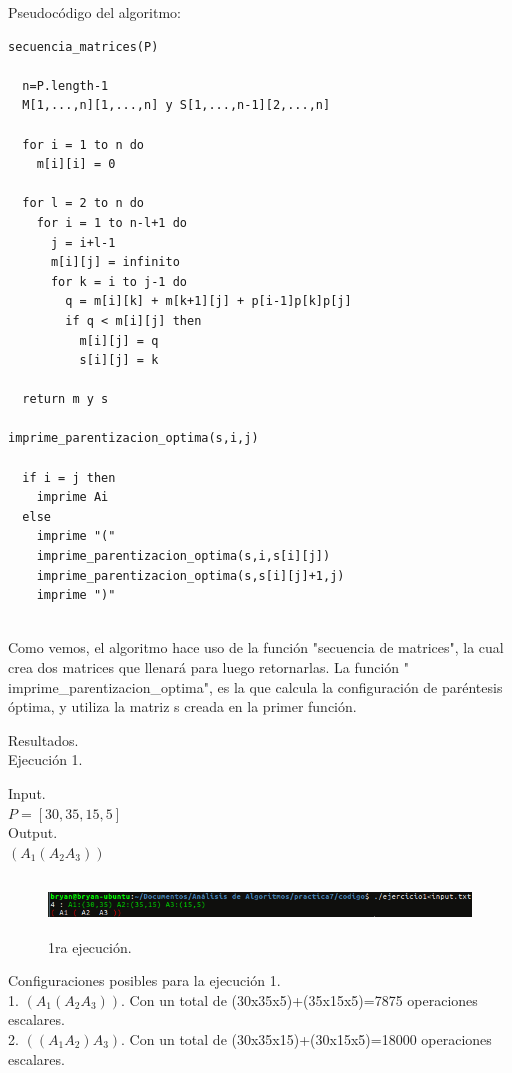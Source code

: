 \documentclass[12pt]{report}
\begin{document}
	
	Pseudocódigo del algoritmo:
	\lstset{language=C, breaklines=true, basicstyle=\footnotesize}
	\lstset{numbers=left, numberstyle=\tiny, stepnumber=1, numbersep=10pt}
	\begin{lstlisting}
secuencia_matrices(P)
  
  n=P.length-1
  M[1,...,n][1,...,n] y S[1,...,n-1][2,...,n]
  
  for i = 1 to n do
    m[i][i] = 0
  
  for l = 2 to n do
    for i = 1 to n-l+1 do
      j = i+l-1
      m[i][j] = infinito
      for k = i to j-1 do
        q = m[i][k] + m[k+1][j] + p[i-1]p[k]p[j]
        if q < m[i][j] then
	      m[i][j] = q
	      s[i][j] = k
	      
  return m y s
  
imprime_parentizacion_optima(s,i,j)
  
  if i = j then
    imprime Ai
  else
    imprime "("
    imprime_parentizacion_optima(s,i,s[i][j])
    imprime_parentizacion_optima(s,s[i][j]+1,j)
    imprime ")"
      
	\end{lstlisting}
	
	Como vemos, el algoritmo hace uso de la función "secuencia de matrices", la cual crea dos matrices que llenará para luego retornarlas. La función " imprime\_parentizacion\_optima", es la que calcula la configuración de paréntesis óptima, y utiliza la matriz s creada en la primer función.\newpage
	
	Resultados.\\
	
	Ejecución 1.
	
	Input.\\
	
		$P=[30,35,15,5]$\\
	
	Output.\\
		
		$(A_{1}(A_{2}A_{3}))$	
	\begin{figure}[H]
		\includegraphics[height=1.5cm,width=16cm]{imagenes/1.png}
		\centering
		\caption{1ra ejecución.}
		\centering
	\end{figure}
	
	Configuraciones posibles para la ejecución 1.\\
	1. $(A_{1}(A_{2}A_{3}))$. Con un total de (30x35x5)+(35x15x5)=7875 operaciones escalares.\\
	2. $((A_{1}A_{2})A_{3})$. Con un total de (30x35x15)+(30x15x5)=18000 operaciones escalares.\\
	
\end{document}
